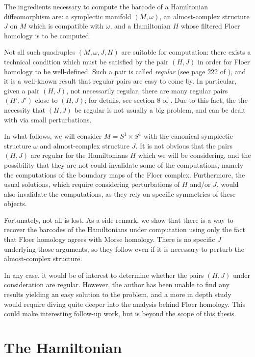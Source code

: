 \begin{remark}\label{rmk:assumenondegen1}
The ingredients necessary to compute the barcode of a Hamiltonian diffeomorphism are: a symplectic manifold $(M,\omega)$, an almost-complex structure $J$ on $M$ which is compatible with $\omega$, and a Hamiltonian $H$ whose filtered Floer homology is to be computed.

Not all such quadruples $(M,\omega,J,H)$ are suitable for computation: there exists a technical condition which must be satisfied by the pair $(H,J)$ in order for Floer homology to be well-defined. Such a pair is called \emph{regular} (see page 222 of \cite{audin}), and it is a well-known result that regular pairs are easy to come by. In particular, given a pair $(H,J)$, not necessarily regular, there are many regular pairs $(H', J')$ close to $(H,J)$; for details, see section 8 of \cite{audin}. Due to this fact, the the necessity that $(H,J)$ be regular is not usually a big problem, and can be dealt with via small perturbations.

In what follows, we will consider $M = S^1 \times S^1$ with the canonical symplectic structure $\omega$ and almost-complex structure $J$. It is not obvious that the pairs $(H,J)$ are regular for the Hamiltonians $H$ which we will be considering, and the possibility that they are not could invalidate some of the computations, namely the computations of the boundary maps of the Floer complex. Furthermore, the usual solutions, which require considering perturbations of $H$ and/or $J$, would also invalidate the computations, as they rely on specific symmetries of these objects.

Fortunately, not all is lost. As a side remark, we show that there is a way to recover the barcodes of the Hamiltonians under computation using only the fact that Floer homology agrees with Morse homology. There is no specific $J$ underlying those arguments, so they follow even if it is necessary to perturb the almost-complex structure.

In any case, it would be of interest to determine whether the pairs $(H,J)$ under consideration are regular. However, the author has been unable to find any results yielding an easy solution to the problem, and a more in depth study would require diving quite deeper into the analysis behind Floer homology. This could make interesting follow-up work, but is beyond the scope of this thesis.
\end{remark}

\section{The Hamiltonian}

